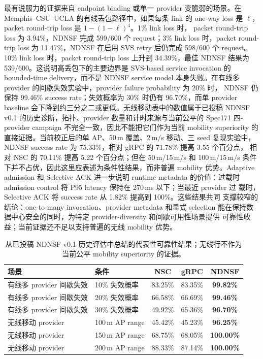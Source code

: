 最有说服力的证据来自 endpoint binding 或单一 provider 变脆弱的场景。在
Memphis--CSU--UCLA 的有线丢包路径中，如果每条 link 的 one-way loss 是
$\ell$，packet round-trip loss 是 $1-(1-\ell)^4$。1\% link loss 时，
packet round-trip loss 为 3.94\%，NDNSF 完成 599/600 个 request；3\%
link loss 时，packet round-trip loss 为 11.47\%，NDNSF 在启用 SVS retry
后仍完成 598/600 个 request。10\% link loss 时，packet round-trip loss
上升到 34.39\%，最佳 NDNSF 结果为 539/600。这说明高丢包下的主要边界是
SVS-based service invocation 的 bounded-time delivery，而不是 NDNSF service
model 本身失败。在有线多 provider 的间歇失效实验中，provider failure probability 为 20\% 时，
NDNSF 仍保持 99.46\% success rate；失效概率为 30\% 时仍有 96.70\%，而单
provider baseline 会下降到约三分之二或更低。无线移动表中的数值属于已投稿
NDNSF v0.1 的历史诊断，拓扑、provider 数量和计时来源与当前公平的 Spec171
四-provider campaign 不完全一致，因此不能把它们作为当前 mobility superiority
的直接证据。当前校正后的单 AP、50\,m 覆盖、2\,m/s 移动、三 seed 复现实验中，
NDNSF success rate 为 75.33\%，相对 gRPC 的 71.78\% 提高 3.55 个百分点，
相对 NSC 的 70.11\% 提高 5.22 个百分点；但在 50\,m/15\,m/s 和
100\,m/15\,m/s 条件下并不占优，因此这里应表述为条件性结果，而非普遍
mobility 优势。Adaptive
admission 和 Selective ACK 进一步说明 runtime metadata 的价值：过载时
admission control 将 P95 latency 保持在 270\,ms 以下；当最近 provider 过
载时，Selective ACK 将 success rate 从 1.82\% 提高到 100\%。这些结果共同
支撑较窄的结论：one-to-many invocation、provider metadata 和显式 selection
能在保持数据中心安全的同时，为特定 provider-diversity 和间歇可用性场景提供
可靠性收益；当前证据还不足以支持普遍的无线 mobility 优势。

\begin{table}[H]
\centering
\caption{从已投稿 NDNSF v0.1 历史评估中总结的代表性可靠性结果；无线行不作为当前公平 mobility superiority 的证据。}
\label{tab:ndnsf-v01-reliability-ch}
\begin{tabularx}{\textwidth}{p{}p{}ccc}
\toprule
场景 & 条件 & NSC & gRPC & NDNSF \\
\midrule
有线多 provider 间歇失效 & 10\% 失效概率 & 83.25\% & 83.35\% & \textbf{99.82\%} \\
有线多 provider 间歇失效 & 20\% 失效概率 & 66.58\% & 66.69\% & \textbf{99.46\%} \\
有线多 provider 间歇失效 & 30\% 失效概率 & 49.92\% & 65.36\% & \textbf{96.70\%} \\
无线移动 provider & 100\,m AP range & 45.42\% & 45.23\% & \textbf{96.25\%} \\
无线移动 provider & 150\,m AP range & 68.75\% & 68.05\% & \textbf{100.00\%} \\
无线移动 provider & 200\,m AP range & 88.33\% & 87.14\% & \textbf{100.00\%} \\
\bottomrule
\end{tabularx}
\end{table}

